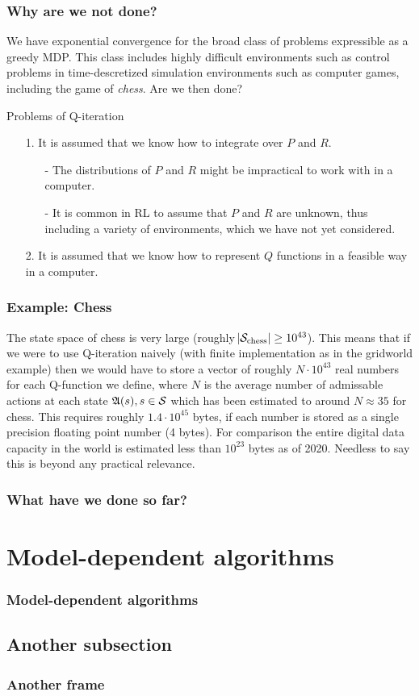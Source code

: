 \documentclass{beamer}[10]
\begin{document}
\begin{frame}
  \frametitle{Why are we not done?}
  \begingroup
  \footnotesize
  We have exponential convergence for the broad class of problems expressible
  as a greedy MDP. This class includes highly difficult environments such as
  control problems in time-descretized simulation environments such as computer
  games, including the game of \emph{chess}. Are we then done?
  \begin{block}{Problems of Q-iteration}
    \begin{itemize}
      \item[1.] It is assumed that we know how to integrate over $P$ and $R$.
	\begin{itemize}
	  \item[-] The distributions of $P$ and $R$ might be impractical to
	    work with in a computer.
	  \item[-] It is common in RL to assume that $P$ and $R$ are unknown,
	    thus including a variety of environments, which we have not yet
	    considered.
	\end{itemize}
      \item[2.] It is assumed that we know how to represent $Q$ functions in 
	a feasible way in a computer.
    \end{itemize}
  \end{block}
  \endgroup
\end{frame}

\begin{frame}
  \frametitle{Example: Chess}
  The state space of chess is very large
  (roughly $\abs{\mathcal{S}_{\mathrm{chess}}} \geq 10^{43}$).
  This means that if we were to use Q-iteration naively
  (with finite implementation as in the gridworld example)
  then we would have to store a vector of
  roughly $N \cdot 10^{43}$ real numbers for each Q-function we define,
  where $N$ is the average number of admissable actions at each state
  $\frak{A}(s), s \in \mathcal{S}$
  which has been estimated to around $N \approx 35$ for chess.
  This requires roughly $1.4 \cdot 10^{45}$ bytes, if each number is stored as a
  single precision floating point number (4 bytes).
  For comparison the entire digital data capacity in the world is estimated
  less than $10^{23}$ bytes as of 2020.
  Needless to say this is beyond any practical relevance.
\end{frame}

\begin{frame}
  \frametitle{What have we done so far?}
\end{frame}

\section{Model-dependent algorithms}

\begin{frame}
  \frametitle{Model-dependent algorithms}
\end{frame}

\subsection{Another subsection}

\begin{frame}
  \frametitle{Another frame}
\end{frame}
\end{document}
